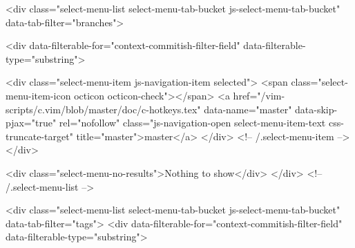       <div class="select-menu-list select-menu-tab-bucket js-select-menu-tab-bucket" data-tab-filter="branches">

        <div data-filterable-for="context-commitish-filter-field" data-filterable-type="substring">


            <div class="select-menu-item js-navigation-item selected">
              <span class="select-menu-item-icon octicon octicon-check"></span>
              <a href="/vim-scripts/c.vim/blob/master/doc/c-hotkeys.tex"
                 data-name="master"
                 data-skip-pjax="true"
                 rel="nofollow"
                 class="js-navigation-open select-menu-item-text css-truncate-target"
                 title="master">master</a>
            </div> <!-- /.select-menu-item -->
        </div>

          <div class="select-menu-no-results">Nothing to show</div>
      </div> <!-- /.select-menu-list -->

      <div class="select-menu-list select-menu-tab-bucket js-select-menu-tab-bucket" data-tab-filter="tags">
        <div data-filterable-for="context-commitish-filter-field" data-filterable-type="substring">


